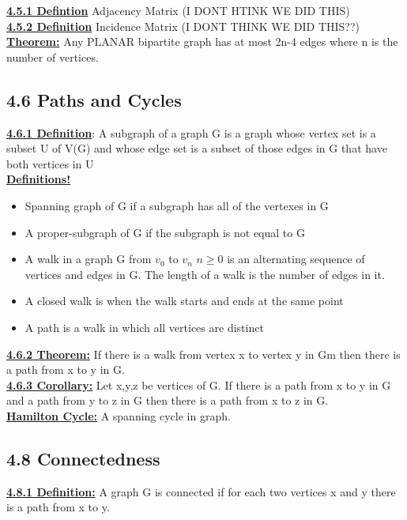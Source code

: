 \documentclass[12pt]{article}
\newcommand{\myt}[1]{\textbf{\underline{#1}}}
\begin{document}
	\myt{4.5.1 Defintion} Adjacency Matrix (I DONT HTINK WE DID THIS)\\
	
	\myt{4.5.2 Definition} Incidence Matrix (I DONT THINK WE DID THIS??)\\
	
	\myt{Theorem:} Any PLANAR bipartite graph has at most 2n-4 edges where n is the number of vertices.\\
	
	\subsection*{4.6 Paths and Cycles}
	\myt{4.6.1 Definition}: A subgraph of a graph G is a graph whose vertex set is a subset U of V(G) and whose edge set is a subset of those edges in G that have both vertices in U\\
	
	\myt{Definitions!}\\
	\begin{itemize}
		\item Spanning graph of G if a subgraph has all of the vertexes in G
		\item A proper-subgraph of G if the subgraph is not equal to G
		\item A walk in a graph G from $v_0$ to $v_n$ $n \geq 0$ is an alternating sequence of vertices and edges in G. The length of a walk is the number of edges in it.
		\item A closed walk is when the walk starts and ends at the same point
		\item A path is a walk in which all vertices are distinct
	\end{itemize}
	
	\myt{4.6.2 Theorem:} If there is a walk from vertex x to vertex y in Gm then there is a path from x to y in G.\\
	
	\myt{4.6.3 Corollary:} Let x,y,z be vertices of G. If there is a path from x to y in G and a path from y to z in G then there is a path from x to z in G.\\

	\myt{Hamilton Cycle:} A spanning cycle in graph.\\
	
	\subsection*{4.8 Connectedness}
	\myt{4.8.1 Definition:} A graph G is connected if for each two vertices x and y there is a path from x to y.\\
	
\end{document}
